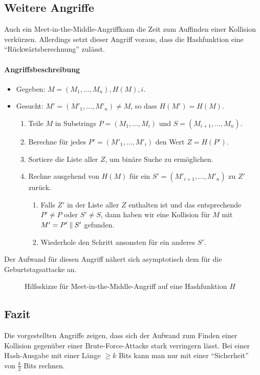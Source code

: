 \subsection{Weitere Angriffe}
Auch ein Meet-in-the-Middle-Angriff\indexMeetInTheMiddle kann die Zeit
zum Auffinden einer Kollision verkürzen. Allerdings setzt dieser Angriff
voraus, dass die Hashfunktion eine "`Rückwärtsberechnung"' zulässt.
\paragraph*{Angriffsbeschreibung}
\begin{itemize}
\item Gegeben: $M = (M_1,\dots,M_n), H(M), i$.
\item Gesucht: $M' = (M'_1,\dots,M'_n) \neq M$, so dass $H(M') = H(M)$.
  \begin{enumerate}
  \item Teile $M$ in Substrings $P = (M_1,\dots,M_i)$ und $S = (M_{i+1},\dots,M_{n})$.
  \item Berechne für jedes $P' = (M'_1,\dots,M'_i)$ den Wert $Z = H(P')$.
  \item Sortiere die Liste aller $Z$, um binäre Suche zu ermöglichen.
  \item Rechne ausgehend von $H(M)$ für ein $S' =
    (M'_{i+1},\dots,M'_{n})$ zu $Z'$ zurück. 
    \begin{enumerate}
    \item Falls $Z'$ in der Liste aller $Z$ enthalten ist und das
      entsprechende $P' \neq P$ oder $S' \neq S$, dann haben wir eine
      Kollision für $M$ mit $M' = P' \mathbin{\|} S'$ gefunden. 
    \item Wiederhole den Schritt ansonsten für ein anderes $S'$.
    \end{enumerate}
  \end{enumerate}
\end{itemize}
Der Aufwand für diesen Angriff nähert sich asymptotisch dem für die
Geburtstagsattacke an. 

\begin{figure}[h]
  \centering
  \caption{Hilfsskizze für Meet-in-the-Middle-Angriff auf eine Hashfunktion $H$}
  \label{fig:md-meet-in-the-middle-attack}
\end{figure}
\subsection{Fazit}
Die vorgestellten Angriffe zeigen, dass sich der Aufwand zum Finden
einer Kollision gegenüber einer Brute-Force-Attacke stark verringern
lässt. Bei einer Hash-Ausgabe mit einer Länge $\geq k$ Bits kann man nur
mit einer "`Sicherheit"' von $\frac{k}{2}$ Bits rechnen.
